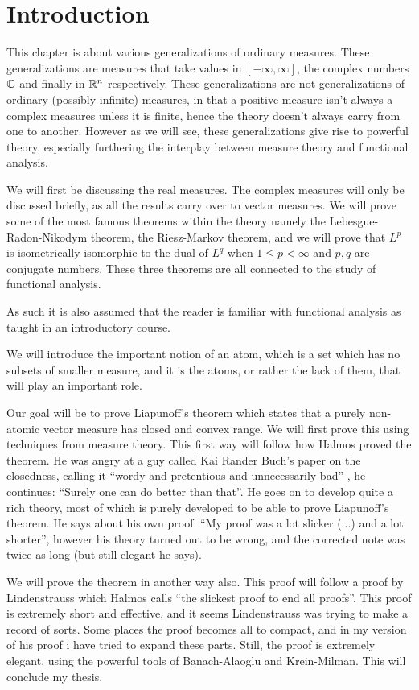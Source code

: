 \documentclass[../../main.tex]{subfiles}
\begin{document}
\section{Introduction}

This chapter is about various generalizations of ordinary measures. These generalizations are measures that take values in $[-\infty, \infty]$, the complex numbers $\mathbb{C}$ and finally in $\mathbb{R}^{n}$ respectively. These generalizations are not generalizations of ordinary (possibly infinite) measures, in that a positive measure isn't always a complex measures unless it is finite, hence the theory doesn't always carry from one to another. However as we will see, these generalizations give rise to powerful theory, especially furthering the interplay between measure theory and functional analysis.

We will first be discussing the real measures. The complex measures will only be discussed briefly, as all the results carry over to vector measures. We will prove some of the most famous theorems within the theory namely the Lebesgue-Radon-Nikodym theorem, the Riesz-Markov theorem, and we will prove that $L^{p}$ is isometrically isomorphic to the dual of $L^{q}$ when $1\le p < \infty$ and $p,q$ are conjugate numbers. These three theorems are all connected to the study of functional analysis.

As such it is also assumed that the reader is familiar with functional analysis as taught in an introductory course.

We will introduce the important notion of an atom, which is a set which has no subsets of smaller measure, and it is the atoms, or rather the lack of them, that will play an important role.

Our goal will be to prove Liapunoff's theorem which states that a purely non-atomic vector measure has closed and convex range. We will first prove this using techniques from measure theory. This first way will follow how Halmos proved the theorem. He was angry at a guy called Kai Rander Buch's paper on the closedness, calling it ``wordy and pretentious and unnecessarily bad'' \cite{Halmos}, he continues: ``Surely one can do better than that''. He goes on to develop quite a rich theory, most of which is purely developed to be able to prove Liapunoff's theorem. He says about his own proof: ``My proof was a lot slicker (...) and a lot shorter'', however his theory turned out to be wrong, and the corrected note was twice as long (but still elegant he says).

We will prove the theorem in another way also. This proof will follow a proof by Lindenstrauss which Halmos calls ``the slickest proof to end all proofs''. This proof is extremely short and effective, and it seems Lindenstrauss was trying to make a record of sorts. Some places the proof becomes all to compact, and in my version of his proof i have tried to expand these parts. Still, the proof is extremely elegant, using the powerful tools of Banach-Alaoglu and Krein-Milman. This will conclude my thesis.
\end{document}
